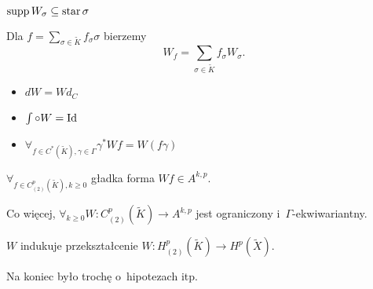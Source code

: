 \begin{uwaga}
	${\mathrm{supp}}\,W_\sigma \subseteq {\mathrm{star}}\, \sigma$
\end{uwaga}

\begin{definicja}
	Dla $f = \sum_{\sigma \in \tilde{K}} f_\sigma \sigma$
	bierzemy $$W_f = \sum_{\sigma \in \tilde{K}} f_\sigma W_\sigma.$$
\end{definicja}

\begin{stwierdzenie}
	\begin{itemize}
		\item $d W = W d_C$
		\item $\int \circ W = {\mathrm{Id}}$
		\item $\forall_{f \in C^\ast(\tilde{K}), \gamma \in \Gamma} 
		\gamma^\ast W f = W(f \gamma)$
	\end{itemize}

\end{stwierdzenie}

\begin{lemat}
	$\forall_{f \in C_{(2)}^p(\tilde{K}), k \geq 0}$
	gładka forma $Wf \in A^{k,p}$.
	
	Co więcej, $\forall_{k \geq 0} W:C_{(2)}^p(\tilde{K}) \to A^{k,p}$
	jest ograniczony i~$\Gamma$-ekwiwariantny.
\end{lemat}

\begin{wniosek}
	$W$ indukuje przekształcenie 
	$W: H_{(2)}^p(\tilde{K}) \to H^p(\tilde{X})$.
\end{wniosek}


Na koniec było trochę o~hipotezach itp.




